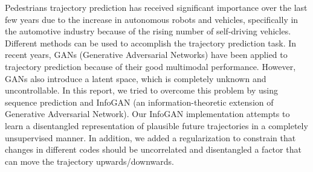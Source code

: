 Pedestrians trajectory prediction has received significant importance over the last few years due to the increase in autonomous robots and vehicles, specifically in the automotive industry because of the rising number of self-driving vehicles. Different methods can be used to accomplish the trajectory prediction task. In recent years, GANs (Generative Adversarial Networks) have been applied to trajectory prediction because of their good multimodal performance. However, GANs also introduce a latent space, which is completely unknown and uncontrollable. In this report, we tried to overcome this problem by using sequence prediction and InfoGAN (an information-theoretic extension of Generative Adversarial Network). Our InfoGAN implementation attempts to learn a disentangled representation of plausible future trajectories in a completely unsupervised manner. In addition, we added a regularization to constrain that changes in different codes should be uncorrelated and disentangled a factor that can move the trajectory upwards/downwards.